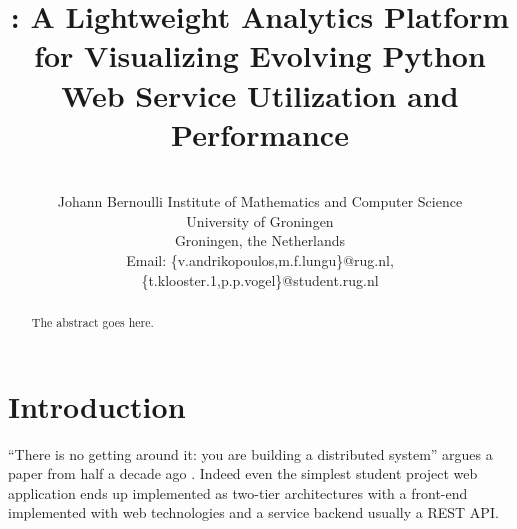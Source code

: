 \documentclass[conference]{IEEEtran}
\begin{document}
%
\title{\tool: A Lightweight Analytics Platform for Visualizing Evolving Python Web Service Utilization and Performance}



\author{
\\
Johann Bernoulli Institute of Mathematics and Computer Science\\
University of Groningen\\
Groningen, the Netherlands\\
Email: \{v.andrikopoulos,m.f.lungu\}@rug.nl, \{t.klooster.1,p.p.vogel\}@student.rug.nl
}

\maketitle

\begin{abstract}
The abstract goes here.
\end{abstract}


\IEEEpeerreviewmaketitle



\section{Introduction}
``There is no getting around it: you are building a distributed system'' argues a paper from half a decade ago \cite{cavage2013there}. Indeed even the simplest student project web application ends up implemented as two-tier architectures with a front-end implemented with web technologies and a service backend usually a REST API.
 
\end{document}
